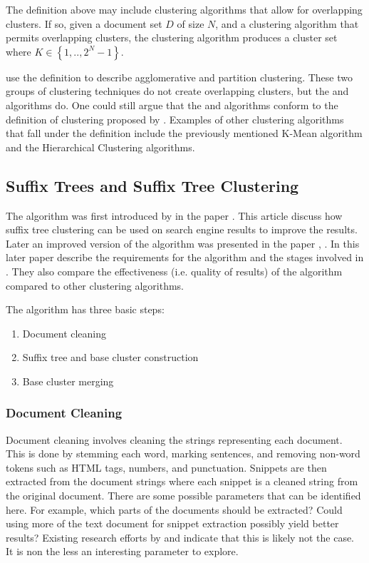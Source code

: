 The definition above may include clustering algorithms that allow for overlapping clusters. If so, given a document set \(D\) of size \(N\), and a clustering algorithm that permits overlapping clusters, the clustering algorithm produces a cluster set where \(K \in \left\{1, .., 2^{N}-1\right\}\).

 \citeauthor{Baeza-Yates2011a} use the definition to describe agglomerative and partition clustering. These two groups of clustering techniques do not create overlapping clusters, but the \STC and \CTC algorithms do. One could still argue that the \STC and \CTC algorithms conform to the definition of clustering proposed by \citeauthor{Baeza-Yates2011a}. Examples of other clustering algorithms that fall under the definition include the previously mentioned K-Mean algorithm and the Hierarchical Clustering algorithms.

\subsection{Suffix Trees and Suffix Tree Clustering}
The \STC algorithm was first introduced by \textcite{Oren1997} in the paper . This article discuss how suffix tree clustering can be used on search engine results to improve the results. Later an improved version of the algorithm was presented in the paper , \parencite{Oren1998}. In this later paper \citeauthor{Oren1998} describe the requirements for the \STC algorithm and the stages involved in \STC. They also compare the effectiveness (i.e. quality of results) of the algorithm compared to other clustering algorithms.

The \STC algorithm has three basic steps:
\begin{enumerate}
\item Document cleaning
\item Suffix tree and base cluster construction
\item Base cluster merging
\end{enumerate}

\subsubsection{Document Cleaning}

Document cleaning involves cleaning the strings representing each document. This is done by stemming each word, marking sentences, and removing non-word tokens such as HTML tags, numbers, and punctuation. Snippets are then extracted from the document strings where each snippet is a cleaned string from the original document. There are some possible parameters that can be identified here. For example, which parts of the documents should be extracted? Could using more of the text document for snippet extraction possibly yield better results? Existing research efforts by \cite{Oren1998} and \cite{Moe2014compact} indicate that this is likely not the case. It is non the less an interesting parameter to explore.

